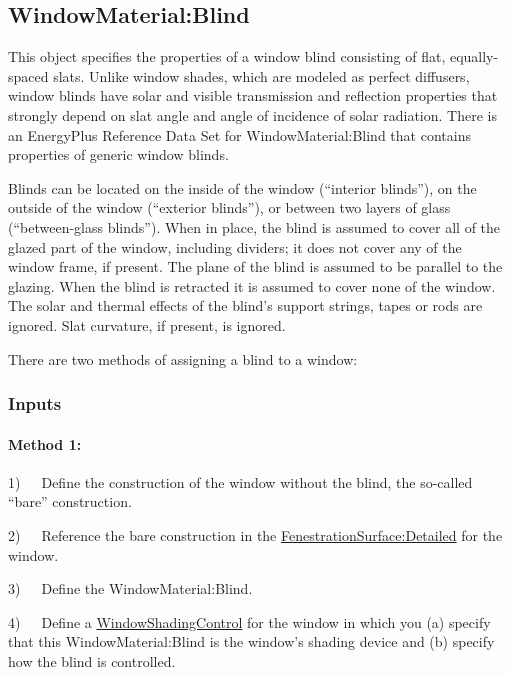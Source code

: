 \subsection{WindowMaterial:Blind}\label{windowmaterialblind}

This object specifies the properties of a window blind consisting of flat, equally-spaced slats. Unlike window shades, which are modeled as perfect diffusers, window blinds have solar and visible transmission and reflection properties that strongly depend on slat angle and angle of incidence of solar radiation. There is an EnergyPlus Reference Data Set for WindowMaterial:Blind that contains properties of generic window blinds.

Blinds can be located on the inside of the window (``interior blinds''), on the outside of the window (``exterior blinds''), or between two layers of glass (``between-glass blinds''). When in place, the blind is assumed to cover all of the glazed part of the window, including dividers; it does not cover any of the window frame, if present. The plane of the blind is assumed to be parallel to the glazing. When the blind is retracted it is assumed to cover none of the window. The solar and thermal effects of the blind's support strings, tapes or rods are ignored. Slat curvature, if present, is ignored.

There are two methods of assigning a blind to a window:

\subsubsection{Inputs}\label{inputs-23-005}

\paragraph{Method 1:}\label{method-1-1}

1)~~~Define the construction of the window without the blind, the so-called ``bare'' construction.

2)~~~Reference the bare construction in the \hyperref[fenestrationsurfacedetailed]{FenestrationSurface:Detailed} for the window.

3)~~~Define the WindowMaterial:Blind.

4)~~~Define a \hyperref[windowpropertyshadingcontrol]{WindowShadingControl} for the window in which you (a) specify that this WindowMaterial:Blind is the window's shading device and (b) specify how the blind is controlled.

